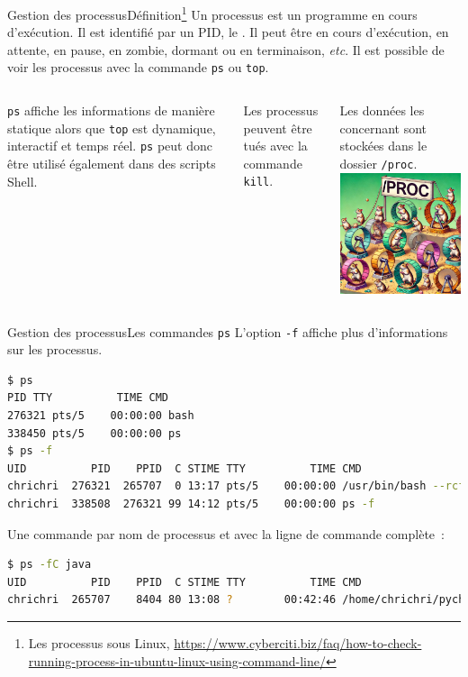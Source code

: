 \documentclass{beamer}
\begin{document}
    \begin{frame}{Gestion des processus}{Définition\footnote{\label{process}Les processus sous Linux, \url{https://www.cyberciti.biz/faq/how-to-check-running-process-in-ubuntu-linux-using-command-line/}}}
        Un processus est un programme en cours d'exécution.
        Il est identifié par un PID, le .
        \bigbreak
        Il peut être en cours d'exécution, en attente, en pause, en zombie, dormant ou en terminaison, \textit{etc}.
        Il est possible de voir les processus avec la commande \lstinline{ps} ou \lstinline{top}.
        \bigbreak
        \begin{columns}
            \lstinline{ps} affiche les informations de manière statique alors que \lstinline{top} est dynamique, interactif et temps réel.
            \lstinline{ps} peut donc être utilisé également dans des scripts Shell.

            Les processus peuvent être tués avec la commande \lstinline{kill}.

            Les données les concernant sont stockées dans le dossier \lstinline{/proc}.
            \centering
            \includegraphics[width=4cm]{image/proc-hamster}
        \end{columns}
    \end{frame}

    \begin{frame}[fragile]{Gestion des processus}{Les commandes \lstinline{ps}}
        L'option \lstinline{-f} affiche plus d'informations sur les processus.
        \begin{lstlisting}[language=bash,basicstyle=\tiny\ttfamily]
$ ps
PID TTY          TIME CMD
276321 pts/5    00:00:00 bash
338450 pts/5    00:00:00 ps
$ ps -f
UID          PID    PPID  C STIME TTY          TIME CMD
chrichri  276321  265707  0 13:17 pts/5    00:00:00 /usr/bin/bash --rcfile /home/chrichri/pycharm-professional-2024.1.4/pycharm-2024.1.4/plugins/terminal/shell-integrations/bash/bash-integration.bash -i
chrichri  338508  276321 99 14:12 pts/5    00:00:00 ps -f
        \end{lstlisting}
        Une commande par nom de processus et avec la ligne de commande complète~:
        \begin{lstlisting}[language=bash,basicstyle=\tiny\ttfamily]
$ ps -fC java
UID          PID    PPID  C STIME TTY          TIME CMD
chrichri  265707    8404 80 13:08 ?        00:42:46 /home/chrichri/pycharm...
        \end{lstlisting}
    \end{frame}
\end{document}
